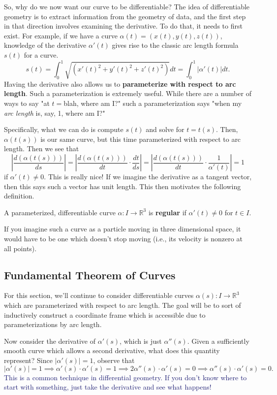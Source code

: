 \documentclass[12pt,letterpaper,boxed]{maths_v5}
\newcommand{\rr}{\mathbb{R}}
\theoremstyle{definition}
\begin{document}
So, why do we now want our curve to be differentiable? The idea of 
differentiable geometry is to extract information from the geometry of data, 
and the first step in that direction involves examining the derivative. 
To do that, it needs to first exist. For example, if we
have a curve $\alpha(t) =  (x(t), y(t), z(t))$, 
knowledge of the derivative $\alpha'(t)$
gives rise to the classic arc length formula $s(t)$ for a curve.
\[
    s(t) = \int_0^{1}\sqrt{(x'(t)^2 + y'(t)^2 + z'(t)^2)}dt = \int_0^{1}|\alpha'(t)|dt. 
\]
Having the derivative also allows us to \textbf{parameterize with respect 
to arc length}. Such a parameterization is extremely useful. While there 
are a number of ways to say "at $t=$blah, where am I?" such a parameterization 
says "when my \textit{arc length} is, say, 1, where am I?" 

Specifically, what we can do is compute $s(t)$ and solve for $t = t(s)$. 
Then, $\alpha(t(s))$ is our same curve, but this time parameterized with 
respect to arc length. Then we see that 
\[
    \left|\frac{d(\alpha(t(s)))}{ds}  \right|
    = 
    \left| \frac{d(\alpha(t(s)))}{dt} \cdot \frac{dt}{ds} \right|
    = 
    \left| \frac{d(\alpha(t(s)))}{dt} \cdot \frac{1}{\alpha'(t)} \right|
    = 1
\]
if $\alpha'(t) \ne 0$. This is really nice! If we imagine the 
derivative as a tangent vector, then this says such a vector has unit length.
This then motivates the 
following definition.

\begin{defn}
    A parameterized, differentiable curve $\alpha: I \to \rr^3$ 
    is \textbf{regular} if $\alpha'(t) \ne 0$ for $t \in I$. 
\end{defn}

If you imagine such a curve as a particle moving in three dimensional space, 
it would have to be one which doesn't stop moving (i.e., its 
velocity is nonzero at all points). 

\newpage
\subsection{Fundamental Theorem of Curves}
For this section, we'll continue to consider differentiable curves 
$\alpha(s): I \to \rr^3$ which are parameterized with respect to 
arc length. The goal will be to sort of inductively construct a 
coordinate frame which is accessible due to parameterizations 
by arc length.

Now consider the derivative of $\alpha'(s)$, which is just $\alpha''(s)$. 
Given a sufficiently smooth curve which allows a second derivative, what does 
this quantity represent? Since $|\alpha'(s)| = 1$, observe that 
\[
    |\alpha'(s)| = 1 
    \implies 
    \alpha'(s)\cdot \alpha'(s) = 1
    \implies 
    2\alpha''(s)\cdot\alpha'(s) = 0 
    \implies 
    \alpha''(s)\cdot \alpha'(s) = 0.
\]
\textcolor{MidnightBlue}{This is a common technique in differential 
geometry. If you don't know where to start with something, just 
take the derivative and see what happens!}
\end{document}
